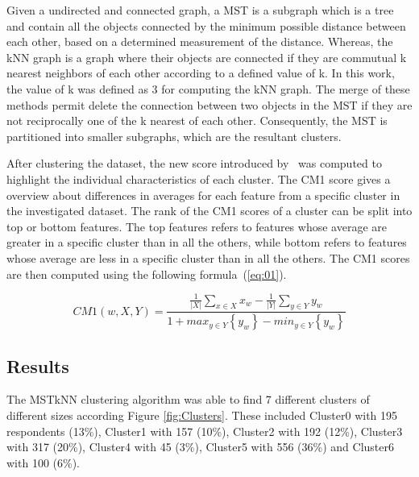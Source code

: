\documentclass{article}
\begin{document}
Given a undirected and connected graph, a MST is a subgraph which is a tree and
contain all the objects connected by the minimum possible distance between each
other, based on a determined measurement of the distance. Whereas, the kNN graph
is a graph where their objects are connected if they are commutual k nearest
neighbors of each other according to a defined value of k. In this work, the
value of k was defined as 3 for computing the kNN graph. The merge of these
methods permit delete the connection between two objects in the MST if they are
not reciprocally one of the k nearest of each other. Consequently, the MST is
partitioned into smaller subgraphs, which are the resultant clusters.


After clustering the dataset, the new score introduced by~\cite{Marsden2013}
was computed to highlight the individual characteristics of each cluster. The
CM1 score gives a overview about differences in averages for each feature from
a specific cluster in the investigated dataset. The rank of the CM1 scores of a
cluster can be split into top or bottom features. The top features refers to
features whose average are greater in a specific cluster than in all the others,
while bottom refers to features whose average are less in a specific cluster
than in all the others. The CM1 scores are then computed using the following
formula~(\ref{eq:01}).

\begin{equation}
CM1(w,X,Y) = \frac{\frac{1}{\left|X\right|}  \sum_{x \in X} x_{w} - \frac{1}{\left|Y\right|}  \sum_{y \in Y} y_{w}} {1 + max_{y \in Y } \left\{ y_{w} \right\}- min_{y \in Y} \left\{y_{w}\right\} } \label{eq:01}
\end{equation}



\subsection{Results}

The MSTkNN clustering algorithm was able to find 7 different clusters of
different sizes according Figure \ref{fig:Clusters}. These included Cluster0
with 195 respondents (13\%), Cluster1 with 157 (10\%), Cluster2 with 192 (12\%),
Cluster3 with 317 (20\%), Cluster4 with 45 (3\%), Cluster5 with 556 (36\%) and
Cluster6 with 100 (6\%).
\end{document}
